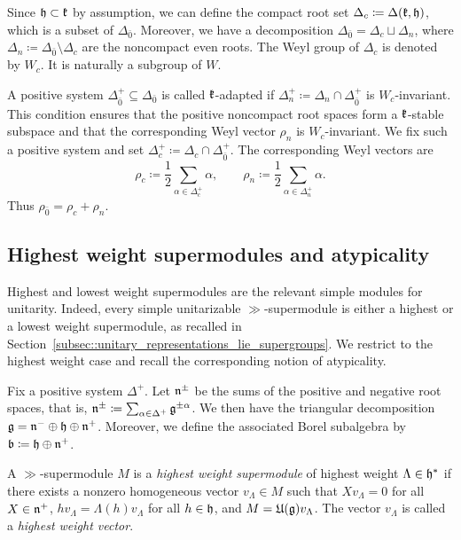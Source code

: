 Since ${\mathfrak h}\subset {\mathfrak k}$ by assumption, we can define the compact root set $\Delta_c\coloneqq\Delta({\mathfrak k},{\mathfrak h})$, which is a subset of $\Delta_{\bar{0}}$. Moreover, we have a decomposition $\Delta_{\bar{0}}=\Delta_{c}\sqcup \Delta_{n}$, where $\Delta_n\coloneqq\Delta_{\bar0}\setminus\Delta_c$ are the noncompact even roots. The Weyl group of $\Delta_{c}$ is denoted by $W_{c}$. It is naturally a subgroup of $W$.

A positive system $\Delta_{\bar0}^{+}\subseteq\Delta_{\bar0}$ is called ${\mathfrak k}$-adapted if $\Delta_n^+\coloneqq\Delta_n\cap\Delta_{\bar0}^+$ is $W_c$-invariant. This condition ensures that the positive noncompact root spaces form a ${\mathfrak k}$-stable subspace and that the corresponding Weyl vector $\rho_n$ is $W_c$-invariant. We fix such a positive system and set $\Delta_c^+\coloneqq\Delta_c\cap\Delta_{\bar0}^+$. The corresponding Weyl vectors are
\begin{equation*}
\rho_c\coloneqq\frac12\sum_{\alpha\in\Delta_c^+}\alpha,
\qquad
\rho_n\coloneqq\frac12\sum_{\alpha\in\Delta_n^+}\alpha.
\end{equation*}
Thus $\rho_{\bar0}=\rho_c+\rho_n$.
 

\subsection{Highest weight supermodules and atypicality}

Highest and lowest weight supermodules are the relevant simple modules for unitarity. Indeed, every simple unitarizable $\gg$-supermodule is either a highest or a lowest weight supermodule, as recalled in Section~\ref{subsec::unitary_representations_lie_supergroups}. We restrict to the highest weight case and recall the corresponding notion of atypicality.

Fix a positive system $\Delta^+$. Let ${\mathfrak{n}}^\pm$ be the sums of the positive and negative root spaces, that is, ${\mathfrak{n}}^{\pm} \coloneqq \sum_{\alpha \in \Delta^{+}}{\mathfrak{g}}^{\pm \alpha}$. We then have the triangular decomposition ${\mathfrak{g}}={\mathfrak{n}}^{-}\oplus {\mathfrak h} \oplus {\mathfrak{n}}^{+}$. Moreover, we define the associated Borel subalgebra by ${\mathfrak b} \coloneqq {\mathfrak h} \oplus {\mathfrak{n}}^{+}$.

\begin{definition}
A $\gg$-supermodule $M$ is a \emph{highest weight supermodule} of highest weight $\Lambda\in{\mathfrak h}^{\ast}$ if there exists a nonzero homogeneous vector $v_\Lambda\in M$ such that $Xv_\Lambda=0$ for all $X\in{\mathfrak{n}}^+$, $hv_\Lambda=\Lambda(h)v_\Lambda$ for all $h\in{\mathfrak h}$, and $M={\mathfrak U}({\mathfrak{g}})v_\Lambda$. The vector $v_\Lambda$ is called a \emph{highest weight vector}. 
\end{definition}


